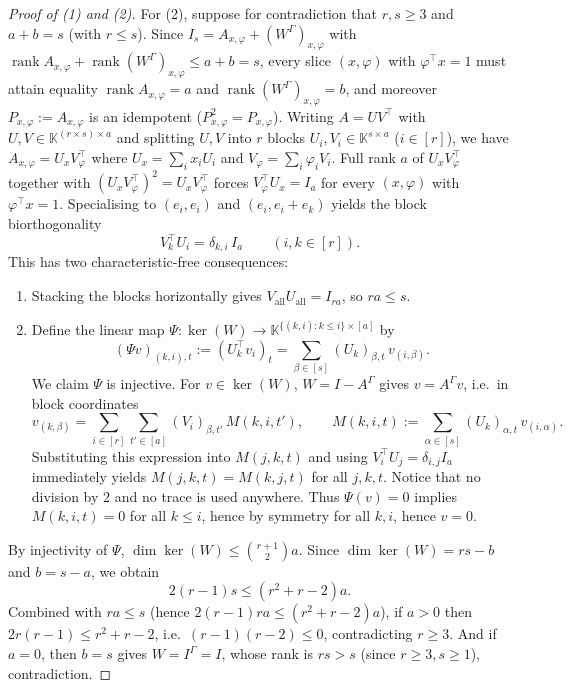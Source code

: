 \documentclass[11pt]{article}
\theoremstyle{definition}
\newcommand{\rk}{\operatorname{rank}}
\newcommand{\K}{\mathbb{K}}
\begin{document}
\begin{proof}[Proof of (1) and (2)]
For (2), suppose for contradiction that $r, s \ge 3$ and $a + b = s$ (with $r \le s$). Since $I_s = A_{x,\varphi} + (W^\Gamma)_{x,\varphi}$ with $\rk A_{x,\varphi} + \rk(W^\Gamma)_{x,\varphi} \le a + b = s$, every slice $(x,\varphi)$ with $\varphi^\top x = 1$ must attain equality $\rk A_{x,\varphi} = a$ and $\rk(W^\Gamma)_{x,\varphi} = b$, and moreover $P_{x,\varphi} := A_{x,\varphi}$ is an idempotent ($P_{x,\varphi}^2 = P_{x,\varphi}$). Writing $A = U V^\top$ with $U, V \in \K^{(r\times s)\times a}$ and splitting $U, V$ into $r$ blocks $U_i, V_i \in \K^{s\times a}$ ($i \in [r]$), we have $A_{x,\varphi} = U_x V_\varphi^\top$ where $U_x = \sum_i x_i U_i$ and $V_\varphi = \sum_i \varphi_i V_i$. Full rank $a$ of $U_x V_\varphi^\top$ together with $(U_x V_\varphi^\top)^2 = U_x V_\varphi^\top$ forces $V_\varphi^\top U_x = I_a$ for every $(x,\varphi)$ with $\varphi^\top x = 1$. Specialising to $(e_i, e_i)$ and $(e_i, e_i + e_k)$ yields the block biorthogonality
\[
  V_k^\top U_i = \delta_{k,i}\, I_a \qquad (i, k \in [r]).
\]
This has two characteristic-free consequences:
\begin{enumerate}
\item[(i)] Stacking the blocks horizontally gives $V_{\mathrm{all}} U_{\mathrm{all}} = I_{ra}$, so $ra \le s$.
\item[(ii)] Define the linear map $\Psi : \ker(W) \to \K^{\{(k,i) : k \le i\} \times [a]}$ by
\[
  (\Psi v)_{(k,i),t} := (U_k^\top v_i)_t = \sum_{\beta \in [s]} (U_k)_{\beta, t}\, v_{(i,\beta)}.
\]
We claim $\Psi$ is injective. For $v \in \ker(W)$, $W = I - A^\Gamma$ gives $v = A^\Gamma v$, i.e.\ in block coordinates
\[
  v_{(k,\beta)} = \sum_{i \in [r]} \sum_{t' \in [a]} (V_i)_{\beta, t'}\, M(k, i, t'), \qquad
  M(k, i, t) := \sum_{\alpha \in [s]} (U_k)_{\alpha, t}\, v_{(i,\alpha)}.
\]
Substituting this expression into $M(j, k, t)$ and using $V_i^\top U_j = \delta_{i,j} I_a$ immediately yields $M(j, k, t) = M(k, j, t)$ for all $j, k, t$. Notice that no division by $2$ and no trace is used anywhere. Thus $\Psi(v) = 0$ implies $M(k, i, t) = 0$ for all $k \le i$, hence by symmetry for all $k, i$, hence $v = 0$.
\end{enumerate}
By injectivity of $\Psi$, $\dim\ker(W) \le \binom{r+1}{2} a$. Since $\dim\ker(W) = rs - b$ and $b = s - a$, we obtain
\[
  2(r-1)s \le (r^2 + r - 2) a.
\]
Combined with $ra \le s$ (hence $2(r-1)ra \le (r^2 + r - 2)a$), if $a > 0$ then $2r(r-1) \le r^2 + r - 2$, i.e.\ $(r-1)(r-2) \le 0$, contradicting $r \ge 3$. And if $a = 0$, then $b = s$ gives $W = I^\Gamma = I$, whose rank is $rs > s$ (since $r \ge 3, s \ge 1$), contradiction.
\end{proof}
\end{document}
